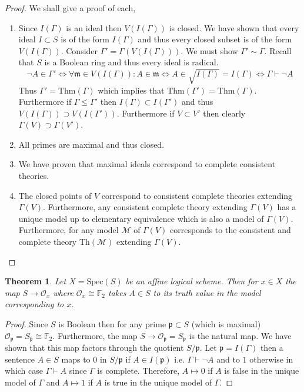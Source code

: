 \documentclass{article}
\newcommand{\proves}{\vdash}
\newcommand{\p}{\mathfrak{p}}
\newcommand{\m}{\mathfrak{m}}
\newcommand{\F}{\mathbb{F}}
\newcommand{\Spec}[1]{\mathrm{Spec}(#1)}
\newcommand{\Thm}[1]{\mathrm{Thm}(#1)}
\newtheorem{thm}{Theorem}
\theoremstyle{plain}
\begin{document}
\begin{proof}
We shall give a proof of each,
\begin{enumerate}
\item Since $I(\Gamma)$ is an ideal then $V(I(\Gamma))$ is closed. We have shown that every ideal $I \subset S$ is of the form $I(\Gamma)$ and thus every closed subset is of the form $V(I(\Gamma))$. Consider $\Gamma' = \Gamma(V(I(\Gamma)))$. We must show $\Gamma' \sim \Gamma$. Recall that $S$ is a Boolean ring and thus every ideal is radical. 
\[ \neg A \in \Gamma' \iff \forall \m \in V(I(\Gamma)) : A \in \m \iff A \in \sqrt{I(\Gamma)} = I(\Gamma) \iff \Gamma \proves \neg A \] Thus $\Gamma' = \Thm{\Gamma}$ which implies that $\Thm{\Gamma'} = \Thm{\Gamma}$. \bigskip\\
Furthermore if $\Gamma \le \Gamma'$ then $I(\Gamma) \subset I(\Gamma')$ and thus $V(I(\Gamma)) \supset V(I(\Gamma'))$. Furthermore if $V \subset V'$ then clearly $\Gamma(V) \supset \Gamma(V')$.

\item All primes are maximal and thus closed.

\item We have proven that maximal ideals correspond to complete consistent theories. 

\item The closed points of $V$ correspond to consistent complete theories extending $\Gamma(V)$. Furthermore, any consistent complete theory extending $\Gamma(V)$ has a unique model up to elementary equivalence which is also a model of $\Gamma(V)$. Furthermore, for any model $\mathcal{M}$ of $\Gamma(V)$ corresponds to the consistent and complete theory $\mathrm{Th}(\mathcal{M})$ extending $\Gamma(V)$. 
\end{enumerate}
\end{proof}

\begin{thm}
Let $X = \Spec{S}$ be an affine logical scheme. Then for $x \in X$ the map $S \to \mathcal{O}_x$ where $\mathcal{O}_x \cong \F_2$ takes $A \in S$ to its truth value in the model corresponding to $x$.  
\end{thm}

\begin{proof}
Since $S$ is Boolean then for any prime $\p \subset S$ (which is maximal) $\mathcal{O}_\p = S_\p \cong \F_2$. Furthermore, the map $S \to \mathcal{O}_\p = S_\p$ is the natural map. We have shown that this map factors through the quotient $S / \p$. Let $\p = I(\Gamma)$ then a sentence $A \in S$ maps to $0$ in $S / \p$ if $A \in I(\p)$ i.e. $\Gamma \proves \neg A$ and to $1$ otherwise in which case $\Gamma \proves A$ since $\Gamma$ is complete. Therefore, $A \mapsto 0$ if $A$ is false in the unique model of $\Gamma$ and $A \mapsto 1$ if $A$ is true in the unique model of $\Gamma$.  
\end{proof}
\end{document}
